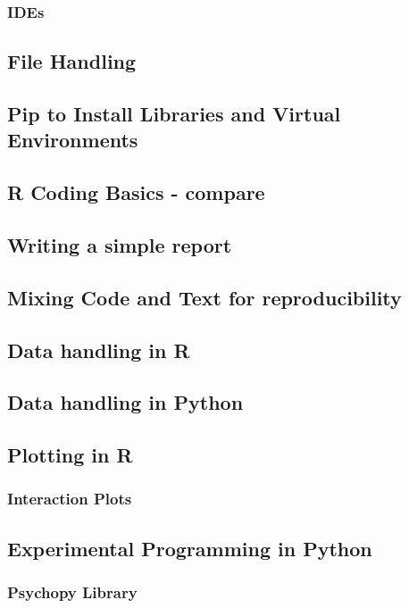 \documentclass{article}
\begin{document}
\subsubsection{IDEs}
\label{sec:orgb98c934}
\subsection{File Handling}
\label{sec:org68e22fb}
\subsection{Pip to Install Libraries and Virtual Environments}
\label{sec:orgfc261a2}
\subsection{R Coding Basics - compare}
\label{sec:org7b960dd}
\subsection{Writing a simple report}
\label{sec:org3cb7d17}
\subsection{Mixing Code and Text for reproducibility}
\label{sec:orgfb9eed3}
\subsection{Data handling in R}
\label{sec:org295817b}
\subsection{Data handling in Python}
\label{sec:orga1f2844}
\subsection{Plotting in R}
\label{sec:org3ac19d4}
\subsubsection{Interaction Plots}
\label{sec:orge3c6a6d}
\subsection{Experimental Programming in Python}
\label{sec:orgf7cd9fd}
\subsubsection{Psychopy Library}
\label{sec:org7ef4ed8}
\end{document}
